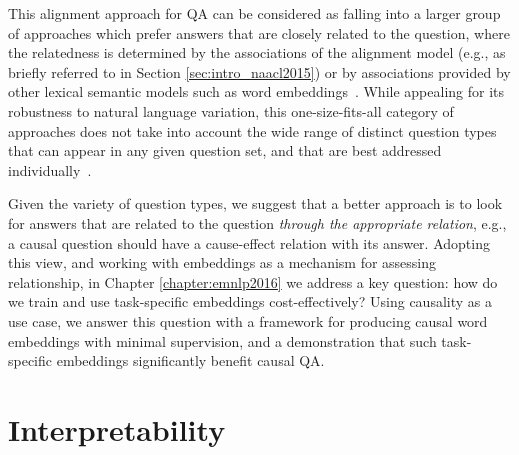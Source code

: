 This alignment approach for QA can be considered as falling into a larger group of approaches which prefer answers that are closely related to the question, where the relatedness is determined by the associations of the alignment model (e.g., as briefly referred to in Section \ref{sec:intro_naacl2015}) or by associations provided by other lexical semantic models such as word embeddings~\citep{yih13,jansen14,fried2015higher}. 
While appealing for its robustness to natural language variation, this one-size-fits-all category of approaches does not take into account the wide range of distinct question types that can appear in any given question set, and that are best addressed individually~\citep{chu2004ibm,ferrucci2010building,clark2013study}.  

Given the variety of question types, we suggest that a better approach is to look for answers that are related to the question \emph{through the appropriate relation}, e.g., a causal question should have a cause-effect relation with its answer.
Adopting this view, and working with embeddings as a mechanism for assessing relationship, in Chapter \ref{chapter:emnlp2016} we address a key question: how do we train and use task-specific embeddings cost-effectively? 
Using causality as a use case, we answer this question with a framework for producing causal word embeddings with minimal supervision, and a demonstration that such task-specific embeddings significantly benefit causal QA. 

\section{Interpretability}
\label{sec:interpretability}





